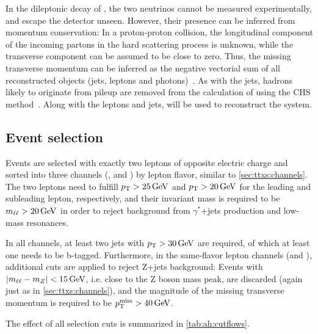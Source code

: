 In the dileptonic decay of \ttbar, the two neutrinos cannot be measured experimentally, and escape the detector unseen. However, their presence can be inferred from momentum conservation: In a proton-proton collision, the longitudinal component of the incoming partons in the hard scattering process is unknown, while the transverse component can be assumed to be close to zero. Thus, the missing transverse momentum \ptmissvec can be inferred as the negative vectorial sum of all reconstructed objects (jets, leptons and photons)~\cite{CMS:JME-17-001}. As with the jets, hadrons likely to originate from pileup are removed from the calculation of \ptmissvec using the CHS method~\cite{CMS:PRF-14-001}. Along with the leptons and jets, \ptmissvec will be used to reconstruct the \ttbar system.

\subsection{Event selection}

Events are selected with exactly two leptons of opposite electric charge and sorted into three channels (\ee, \emu and \mumu) by lepton flavor, similar to \cref{sec:ttxs:channels}. The two leptons need to fulfill $\pt > \SI{25}{\GeV}$ and $\pt > \SI{20}{\GeV}$ for the leading and subleading lepton, respectively, and their invariant mass is required to be $\mll > \SI{20}{\GeV}$ in order to reject background from $\gamma^*$+jets production and low-mass resonances. 

In all channels, at least two jets with $\pt > \SI{30}{\GeV}$ are required, of which at least one needs to be b-tagged. Furthermore, in the same-flavor lepton channels (\ee and \mumu), additional cuts are applied to reject Z+jets background: Events with $|\mll - m_Z| < \SI{15}{\GeV}$, i.e. close to the Z boson mass peak, are discarded (again just as in \cref{sec:ttxs:channels}), and the magnitude of the missing transverse momentum is required to be $\ptmiss > \SI{40}{\GeV}$.

The effect of all selection cuts is summarized in \cref{tab:ah:cutflows}.


